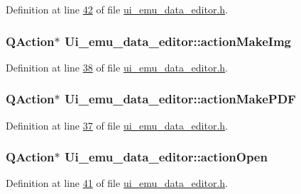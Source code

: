 Definition at line \hyperlink{a00051_source_l00042}{42} of file \hyperlink{a00051_source}{ui\+\_\+emu\+\_\+data\+\_\+editor.\+h}.

\hypertarget{a00026_a345313e538e5ef49cd27c1fc0bdd4173}{
\subsubsection[{action\+Make\+Img}]{\setlength{\rightskip}{0pt plus 5cm}Q\+Action$\ast$ Ui\+\_\+emu\+\_\+data\+\_\+editor\+::action\+Make\+Img}}\label{a00026_a345313e538e5ef49cd27c1fc0bdd4173}


Definition at line \hyperlink{a00051_source_l00038}{38} of file \hyperlink{a00051_source}{ui\+\_\+emu\+\_\+data\+\_\+editor.\+h}.

\hypertarget{a00026_af013c084ff0ed9ae39a60aa7a39bdd91}{
\subsubsection[{action\+Make\+P\+D\+F}]{\setlength{\rightskip}{0pt plus 5cm}Q\+Action$\ast$ Ui\+\_\+emu\+\_\+data\+\_\+editor\+::action\+Make\+P\+D\+F}}\label{a00026_af013c084ff0ed9ae39a60aa7a39bdd91}


Definition at line \hyperlink{a00051_source_l00037}{37} of file \hyperlink{a00051_source}{ui\+\_\+emu\+\_\+data\+\_\+editor.\+h}.

\hypertarget{a00026_a3ceb57268680eb23f6a3d522b303bb43}{
\subsubsection[{action\+Open}]{\setlength{\rightskip}{0pt plus 5cm}Q\+Action$\ast$ Ui\+\_\+emu\+\_\+data\+\_\+editor\+::action\+Open}}\label{a00026_a3ceb57268680eb23f6a3d522b303bb43}


Definition at line \hyperlink{a00051_source_l00041}{41} of file \hyperlink{a00051_source}{ui\+\_\+emu\+\_\+data\+\_\+editor.\+h}.


